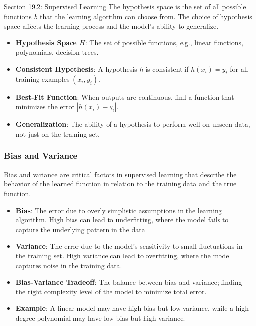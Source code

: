 \begin{notes}{Section 19.2: Supervised Learning}
    The hypothesis space is the set of all possible functions $h$ that the learning algorithm can choose from. The choice of hypothesis space affects the learning process and the model's ability to generalize.
    
    \begin{highlight}
    
        \begin{itemize}
            \item \textbf{Hypothesis Space $H$}: The set of possible functions, e.g., linear functions, polynomials, decision trees.
            \item \textbf{Consistent Hypothesis}: A hypothesis $h$ is consistent if $h(x_i) = y_i$ for all training examples $(x_i, y_i)$.
            \item \textbf{Best-Fit Function}: When outputs are continuous, find a function that minimizes the error $|h(x_i) - y_i|$.
            \item \textbf{Generalization}: The ability of a hypothesis to perform well on unseen data, not just on the training set.
        \end{itemize}
    
    \end{highlight}
    
    \subsubsection*{Bias and Variance}
    
    Bias and variance are critical factors in supervised learning that describe the behavior of the learned function in relation to the training data and the true function.
    
    \begin{highlight}
    
        \begin{itemize}
            \item \textbf{Bias}: The error due to overly simplistic assumptions in the learning algorithm. High bias can lead to underfitting, where the model fails to capture the underlying pattern in the data.
            \item \textbf{Variance}: The error due to the model's sensitivity to small fluctuations in the training set. High variance can lead to overfitting, where the model captures noise in the training data.
            \item \textbf{Bias-Variance Tradeoff}: The balance between bias and variance; finding the right complexity level of the model to minimize total error.
            \item \textbf{Example}: A linear model may have high bias but low variance, while a high-degree polynomial may have low bias but high variance.
        \end{itemize}
    

\end{highlight}
\end{notes}
